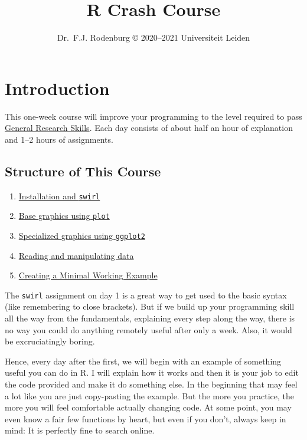 \documentclass[
]{book}
\title{R Crash Course}
\author{Dr.~F.J. Rodenburg © 2020--2021 Universiteit Leiden}
\date{}
\providecommand{\tightlist}{%
  \setlength{\itemsep}{0pt}\setlength{\parskip}{0pt}}
\begin{document}
\maketitle

{
\setcounter{tocdepth}{1}
\tableofcontents
}
\hypertarget{introduction}{%
\chapter*{Introduction}\label{introduction}}

This one-week course will improve your programming to the level required to pass \href{https://fransrodenburg.github.io/General-Research-Skills/}{General Research Skills}. Each day consists of about half an hour of explanation and 1--2 hours of assignments.

\hypertarget{structure-of-this-course}{%
\section*{Structure of This Course}\label{structure-of-this-course}}

\begin{enumerate}
\def\labelenumi{\arabic{enumi}.}
\tightlist
\item
  \protect\hyperlink{installation}{Installation and \texttt{swirl}}
\item
  \protect\hyperlink{base-graphics}{Base graphics using \texttt{plot}}
\item
  \protect\hyperlink{ggplot2}{Specialized graphics using \texttt{ggplot2}}
\item
  \protect\hyperlink{data-manipulation}{Reading and manipulating data}
\item
  \protect\hyperlink{MWE}{Creating a Minimal Working Example}
\end{enumerate}

The \texttt{swirl} assignment on day 1 is a great way to get used to the basic syntax (like remembering to close brackets). But if we build up your programming skill all the way from the fundamentals, explaining every step along the way, there is no way you could do anything remotely useful after only a week. Also, it would be excruciatingly boring.

Hence, every day after the first, we will begin with an example of something useful you can do in R. I will explain how it works and then it is your job to edit the code provided and make it do something else. In the beginning that may feel a lot like you are just copy-pasting the example. But the more you practice, the more you will feel comfortable actually changing code. At some point, you may even know a fair few functions by heart, but even if you don't, always keep in mind: It is perfectly fine to search online.
\end{document}

